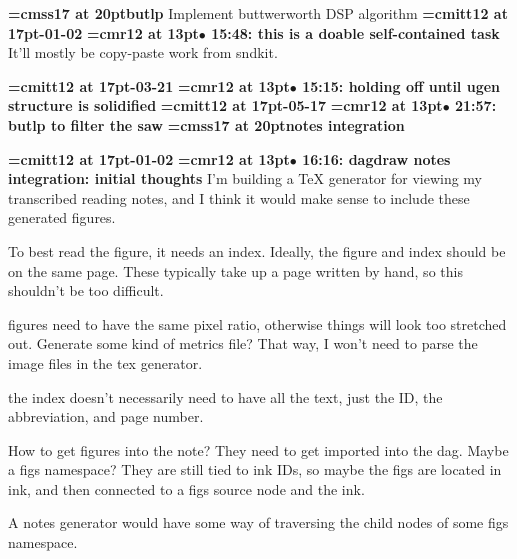 {\medskip\noindent\bf\font\titlefont=cmss17 at 20pt\titlefont butlp}\medskip
Implement buttwerworth DSP algorithm
{\medskip\noindent\bf\font\titlefont=cmitt12 at 17pt-01-02}\medskip
{\smallskip\noindent\bf\font\titlefont=cmr12 at 13pt\titlefont $\bullet$ 15:48: this is a doable self-contained task}\smallskip
It'll mostly be copy-paste work from sndkit.
\par

{\medskip\noindent\bf\font\titlefont=cmitt12 at 17pt-03-21}\medskip
{\smallskip\noindent\bf\font\titlefont=cmr12 at 13pt\titlefont $\bullet$ 15:15: holding off until ugen structure is solidified}\smallskip
{\medskip\noindent\bf\font\titlefont=cmitt12 at 17pt-05-17}\medskip
{\smallskip\noindent\bf\font\titlefont=cmr12 at 13pt\titlefont $\bullet$ 21:57: butlp to filter the saw}\smallskip
{}
{\medskip\noindent\bf\font\titlefont=cmss17 at 20pt\titlefont notes integration}\medskip

{\medskip\noindent\bf\font\titlefont=cmitt12 at 17pt-01-02}\medskip
{\smallskip\noindent\bf\font\titlefont=cmr12 at 13pt\titlefont $\bullet$ 16:16: dagdraw notes integration: initial thoughts}\smallskip
I'm building a TeX generator for viewing my transcribed reading notes, and I think it would make sense to include these generated figures.
\par

To best read the figure, it needs an index. Ideally, the figure and index should be on the same page. These typically take up a page written by hand, so this shouldn't be too difficult.
\par

figures need to have the same pixel ratio, otherwise things will look too stretched out. Generate some kind of metrics file? That way, I won't need to parse the image files in the tex generator.
\par

the index doesn't necessarily need to have all the text, just the ID, the abbreviation, and page number.
\par

How to get figures into the note? They need to get imported into the dag. Maybe a figs namespace? They are still tied to ink IDs, so maybe the figs are located in ink, and then connected to a figs source node and the ink.
\par

A notes generator would have some way of traversing the child nodes of some figs namespace.
\par

